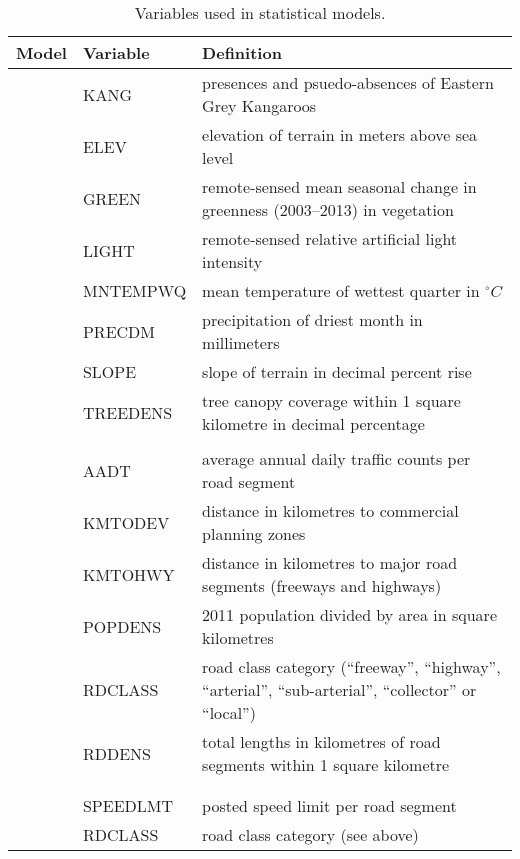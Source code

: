 \begin{table}[htp]
\caption[Variables used in statistical models]{Variables used in statistical models.}
\begin{tabularx}{0.9\textwidth}{llY} \toprule
Model &Variable    &Definition\\ \midrule 
{}   &KANG        &presences and psuedo-absences of Eastern Grey Kangaroos\\
           		 &ELEV        &elevation of terrain in meters above sea level\\
           		 &GREEN       &remote-sensed mean seasonal change in greenness (2003--2013) in vegetation\\
           		 &LIGHT       &remote-sensed relative artificial light intensity\\
           		 &MNTEMPWQ    &mean temperature of wettest quarter in $^{\circ}C$\\
           		 &PRECDM      &precipitation of driest month in millimeters\\
           		 &SLOPE       &slope of terrain in decimal percent rise\\
           		 &TREEDENS    &tree canopy coverage within 1 square kilometre in decimal percentage\\
&&\\
   &AADT        &average annual daily traffic counts per road segment\\
           		 &KMTODEV     &distance in kilometres to commercial planning zones\\
           		 &KMTOHWY     &distance in kilometres to major road segments (freeways and highways)\\
           		 &POPDENS     &2011 population divided by area in square kilometres\\
           		 &RDCLASS     &road class category (``freeway'', ``highway'', ``arterial'', ``sub-arterial'', ``collector'' or ``local'')\\
           		 &RDDENS      &total lengths in kilometres of road segments within 1 square kilometre\\
&&\\
 &&\\
    			 &SPEEDLMT    &posted speed limit per road segment	\\
           		 &RDCLASS     &road class category (see above)\\

\end{tabularx}
\end{table}
